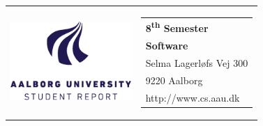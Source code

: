 \begin{titlepage}
    \setlength{\textwidth}{15cm}
    \noindent
    \begin{nopagebreak}
        {\samepage
            \begin{tabular}{lr}
                \parbox{0.40\textwidth}{\raisebox{11mm}
                    {\includegraphics[height=3cm]{img/aau-logo-english.png}}
                } &
                \parbox{0.4\textwidth}{
                    \small
                    \begin{tabular}{l}
                        {\sf\small \textbf{8\textsuperscript{th} Semester}}\\
                        {\sf\small \textbf{Software}}\\
                        {\sf\small Selma Lagerløfs Vej 300 } \\
                        {\sf\small 9220 Aalborg} \\
                        {\sf\small http://www.cs.aau.dk}
                    \end{tabular}
                }
            \end{tabular}

}
\end{nopagebreak}
\end{titlepage}
